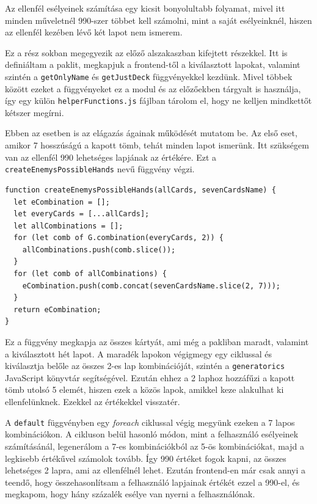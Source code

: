 
Az ellenfél esélyeinek számítása egy kicsit bonyolultabb folyamat, mivel itt minden műveletnél 990-szer többet kell számolni, mint a saját esélyeinknél, hiszen az ellenfél kezében lévő két lapot nem ismerem.

Ez a rész sokban megegyezik az előző alszakaszban kifejtett részekkel. Itt is definiáltam a paklit, megkapjuk a frontend-től a kiválasztott lapokat, valamint szintén a \texttt{getOnlyName} és \texttt{getJustDeck} függvényekkel kezdünk. Mivel többek között ezeket a függvényeket ez a modul és az előzőekben tárgyalt is használja, így egy külön \texttt{helperFunctions.js} fájlban tárolom el, hogy ne kelljen mindkettőt kétszer megírni.

Ebben az esetben is az elágazás ágainak működését mutatom be. Az első eset, amikor 7 hosszúságú a kapott tömb, tehát minden lapot ismerünk. Itt szükségem van az ellenfél 990 lehetséges lapjának az értékére. Ezt a \texttt{createEnemysPossibleHands} nevű függvény végzi.

\newpage

\begin{lstlisting}[style=htmlcssjs]
function createEnemysPossibleHands(allCards, sevenCardsName) {
  let eCombination = [];
  let everyCards = [...allCards];
  let allCombinations = [];
  for (let comb of G.combination(everyCards, 2)) {
    allCombinations.push(comb.slice());
  }
  for (let comb of allCombinations) {
    eCombination.push(comb.concat(sevenCardsName.slice(2, 7)));
  }
  return eCombination;
}
\end{lstlisting}

Ez a függvény megkapja az összes kártyát, ami még a pakliban maradt, valamint a kiválasztott hét lapot. A maradék lapokon végigmegy egy ciklussal és kiválasztja belőle az összes 2-es lap kombinációját, szintén a \texttt{generatorics} \cite{generatorics} JavaScript könyvtár segítségével. Ezután ehhez a 2 laphoz hozzáfűzi a kapott tömb utolsó 5 elemét, hiszen ezek a közös lapok, amikkel keze alakulhat ki ellenfelünknek. Ezekkel az értékekkel visszatér.

A \texttt{default} függvényben egy \textit{foreach} ciklussal végig megyünk ezeken a 7 lapos kombinációkon. A cikluson belül hasonló módon, mint a felhasználó esélyeinek számításánál, legenerálom a 7-es kombinációkból az 5-ös kombinációkat, majd a legkisebb értékűvel számolok tovább. Így 990 értéket fogok kapni, az összes lehetséges 2 lapra, ami az ellenfélnél lehet. Ezután frontend-en már csak annyi a teendő, hogy összehasonlítsam a felhasználó lapjainak értékét ezzel a 990-el, és megkapom, hogy hány százalék esélye van nyerni a felhasználónak.

